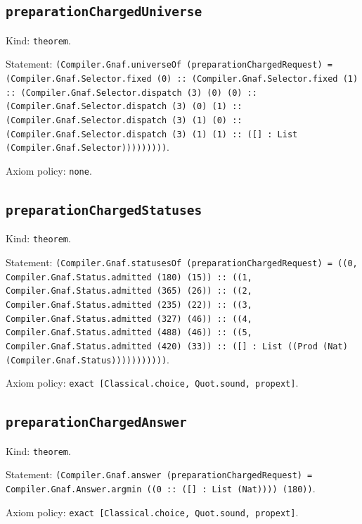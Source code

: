 \documentclass[11pt]{article}
\begin{document}
\subsection*{\texttt{preparationChargedUniverse}}
\noindent Kind: \texttt{theorem}.\par
\noindent Statement: \texttt{(Compiler.Gnaf.universeOf (preparationChargedRequest) = (Compiler.Gnaf.Selector.fixed (0) :: (Compiler.Gnaf.Selector.fixed (1) :: (Compiler.Gnaf.Selector.dispatch (3) (0) (0) :: (Compiler.Gnaf.Selector.dispatch (3) (0) (1) :: (Compiler.Gnaf.Selector.dispatch (3) (1) (0) :: (Compiler.Gnaf.Selector.dispatch (3) (1) (1) :: ([] : List (Compiler.Gnaf.Selector)))))))))}.\par
\noindent Axiom policy: \texttt{none}.\par
\subsection*{\texttt{preparationChargedStatuses}}
\noindent Kind: \texttt{theorem}.\par
\noindent Statement: \texttt{(Compiler.Gnaf.statusesOf (preparationChargedRequest) = ((0, Compiler.Gnaf.Status.admitted (180) (15)) :: ((1, Compiler.Gnaf.Status.admitted (365) (26)) :: ((2, Compiler.Gnaf.Status.admitted (235) (22)) :: ((3, Compiler.Gnaf.Status.admitted (327) (46)) :: ((4, Compiler.Gnaf.Status.admitted (488) (46)) :: ((5, Compiler.Gnaf.Status.admitted (420) (33)) :: ([] : List ((Prod (Nat) (Compiler.Gnaf.Status)))))))))))}.\par
\noindent Axiom policy: \texttt{exact [Classical.choice, Quot.sound, propext]}.\par
\subsection*{\texttt{preparationChargedAnswer}}
\noindent Kind: \texttt{theorem}.\par
\noindent Statement: \texttt{(Compiler.Gnaf.answer (preparationChargedRequest) = Compiler.Gnaf.Answer.argmin ((0 :: ([] : List (Nat)))) (180))}.\par
\noindent Axiom policy: \texttt{exact [Classical.choice, Quot.sound, propext]}.\par
\end{document}
